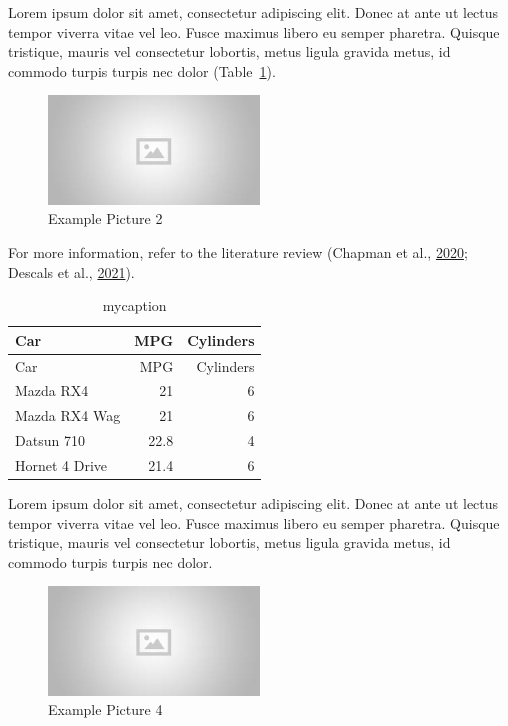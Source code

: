 \documentclass[
]{article}
\begin{document}
Lorem ipsum dolor sit amet, consectetur adipiscing elit. Donec at ante
ut lectus tempor viverra vitae vel leo. Fusce maximus libero eu semper
pharetra. Quisque tristique, mauris vel consectetur lobortis, metus
ligula gravida metus, id commodo turpis turpis nec dolor
(Table~\ref{tbl-mytable3}).

\begin{figure}

{\centering \includegraphics[width=0.5\textwidth,height=\textheight]{placeholder.jpg}

}

\caption{Example Picture 2}

\end{figure}

For more information, refer to the literature review (Chapman et al.,
\protect\hyperlink{ref-chapmanCompoundingImpactDeforestation2020}{2020};
Descals et al.,
\protect\hyperlink{ref-descalsHighresolutionGlobalMap2021}{2021}).

\hypertarget{tbl-mytable3}{}
\begin{longtable}[]{@{}lrr@{}}
\caption{\label{tbl-mytable3}mycaption}\tabularnewline
\toprule\noalign{}
Car & MPG & Cylinders \\
\midrule\noalign{}
\endfirsthead
\toprule\noalign{}
Car & MPG & Cylinders \\
\midrule\noalign{}
\endhead
\bottomrule\noalign{}
\endlastfoot
Mazda RX4 & 21 & 6 \\
Mazda RX4 Wag & 21 & 6 \\
Datsun 710 & 22.8 & 4 \\
Hornet 4 Drive & 21.4 & 6 \\
\end{longtable}

Lorem ipsum dolor sit amet, consectetur adipiscing elit. Donec at ante
ut lectus tempor viverra vitae vel leo. Fusce maximus libero eu semper
pharetra. Quisque tristique, mauris vel consectetur lobortis, metus
ligula gravida metus, id commodo turpis turpis nec dolor.

\begin{figure}

\includegraphics[width=0.5\textwidth,height=\textheight]{placeholder.jpg} \hfill{}

\caption{Example Picture 4}

\end{figure}
\end{document}
